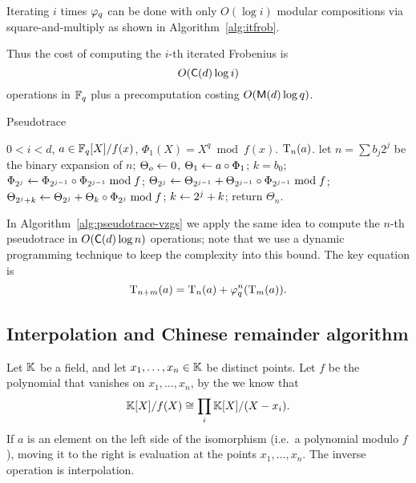 Iterating $i$ times $\varphi_q$ can be done with only $O(\log i)$
modular compositions via square-and-multiply as shown in
Algorithm~\ref{alg:itfrob}.

\ifafourps\enlargethispage{\baselineskip}\fi

Thus the cost of computing the $i$-th iterated Frobenius is
\begin{equation}
  \label{eq:204}
  O(\mathsf{C}(d)\log i)
\end{equation}
operations in $\mathbb{F}_q$ plus a precomputation costing $O(\mathsf{M}(d)\log
q)$.

\begin{algorithm}
  \caption{Pseudotrace}
  \label{alg:pseudotrace-vzgs}
  \begin{algorithmic}[1]
    \REQUIRE $0<i<d$, $a\in\mathbb{F}_q[X]/f(x)$, $\Phi_1(X) = X^q\bmod f(x)$.
    \ENSURE $\operatorname{T}_n(a)$.
    \STATE let $n=\sum b_j2^j$ be the binary expansion of $n$;
    \STATE $\Theta_o \leftarrow 0$, $\Theta_1 \leftarrow a\circ\Phi_{1}$;
    \STATE $k=b_0$;
    \STATE $\Phi_{2^j} \leftarrow \Phi_{2^{j-1}}\circ\Phi_{2^{j-1}} \bmod f$;
    \STATE $\Theta_{2^j} \leftarrow \Theta_{2^{j-1}} + \Theta_{2^{j-1}}\circ\Phi_{2^{j-1}} \bmod f$;
    \STATE $\Theta_{2^j+k} \leftarrow \Theta_{2^j} + \Theta_{k}\circ\Phi_{2^j} \bmod f$;
    \STATE $k \leftarrow 2^j + k$;
    \ENDIF
    \ENDFOR
    \STATE return $\Theta_n$.
  \end{algorithmic}
\end{algorithm}

In Algorithm~\ref{alg:pseudotrace-vzgs} we apply the same idea to
compute the $n$-th pseudotrace in $O(\mathsf{C}(d)\log n)$ operations;
note that we use a dynamic programming technique to keep the
complexity into this bound. The key equation is
\begin{equation}
  \label{eq:205}
  \operatorname{T}_{n+m}(a) = \operatorname{T}_{n}(a)+\varphi_q^n(\operatorname{T}_{m}(a))
  \text{.}
\end{equation}


\subsection{Interpolation and Chinese remainder algorithm}
\label{sec:chin-rema-algor}
Let $\mathbb{K}$ be a field, and let $x_1,\ldots,x_n\in\mathbb{K}$ be distinct
points. Let $f$ be the polynomial that vanishes on $x_1,\ldots,x_n$,
by the 
we know that
\begin{equation}
  \label{eq:221}
  \mathbb{K}[X]/f(X) \cong\prod_i \mathbb{K}[X]/(X-x_i)
  \text{.}
\end{equation}
If $a$ is an element on the left side of the isomorphism (i.e.\ a
polynomial modulo $f$), moving it to the right is evaluation at the
points $x_1,\ldots,x_n$. The inverse operation is interpolation. 


